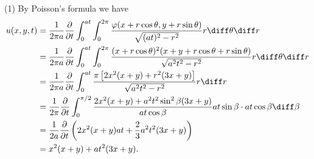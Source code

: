 \begin{solve}
  (1) By Poisson's formula we have
  \begin{align*}
    u(x,y,t)
    & = \frac{1}{2\pi a}\frac{\partial}{\partial t}\int_0^{at}\int_0^{2\pi}\frac{\varphi(x         
      + r\cos\theta,y+r\sin\theta)}{\sqrt{(at)^2-r^2}}r\diff\theta\diff r \\
    & = \frac{1}{2\pi a}\frac{\partial}{\partial t}\int_0^{at}
      \int_0^{2\pi}\frac{(x+r\cos\theta)^2
      (x+y+r\cos\theta+r\sin\theta)}{\sqrt{a^2t^2-r^2}}r\diff\theta\diff r \\
    & = \frac{1}{2\pi a}\frac{\partial}{\partial t}
      \int_0^{at}\frac{\pi\left[2x^2(x+y)+r^2(3x+y)\right]}{\sqrt{a^2t^2-r^2}}r\diff r \\
    & = \frac{1}{2\pi}\frac{\partial}{\partial t}\int_0^{\pi/2}
      \frac{2x^2(x+y)+a^2t^2\sin^2\beta(3x+y)}{at\cos\beta}
      at\sin\beta\cdot at\cos\beta \diff\beta \\
    & = \frac{1}{2a}\frac{\partial}{\partial t}\left(2x^2(x+y)at+\frac{2}{3}a^2t^2(3x+y)\right)\\
    & = x^2(x+y)+at^2(3x+y).
  \end{align*}


\end{solve}
